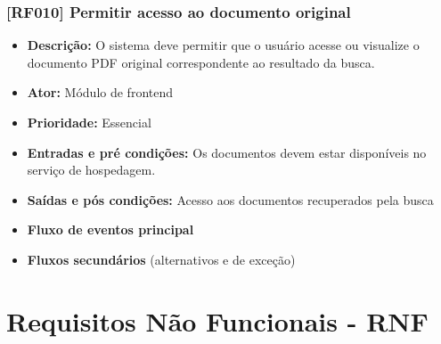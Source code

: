 \subsubsection{[RF010] Permitir acesso ao documento original}
\begin{itemize}
   \item \textbf{Descrição:} O sistema deve permitir que o usuário acesse ou visualize o documento PDF original correspondente ao resultado da busca.
   \item \textbf{Ator:} Módulo de frontend
   \item \textbf{Prioridade:} Essencial
   \item \textbf{Entradas e pré condições:} Os documentos devem estar disponíveis no serviço de hospedagem.
   \item \textbf{Saídas e pós condições:} Acesso aos documentos recuperados pela busca
   \item \textbf{Fluxo de eventos principal}
   \item \textbf{Fluxos secundários} (alternativos e de exceção)
 \end{itemize}

\section{Requisitos Não Funcionais - RNF}

